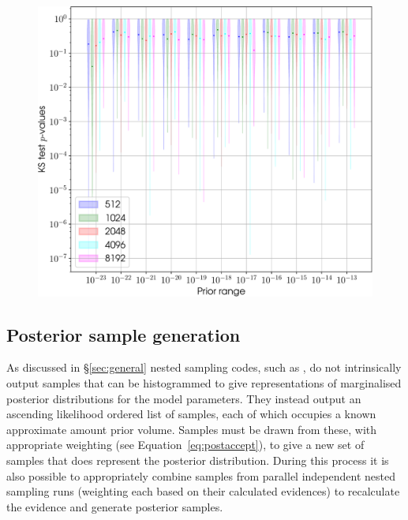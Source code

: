 \begin{figure}[!phtb]
\begin{center}
\includegraphics[width=1\columnwidth]{./figures/proptesting/walk_uniform_prop/kstest/collate_plots_wup_ks}
\caption{ \protect}
\end{center}
\end{figure}

\subsection{Posterior sample generation}\label{sec:postsamps}

As discussed in \S\ref{sec:general} nested sampling codes, such as \lppen, do not intrinsically output samples that can be histogrammed to give
representations of marginalised posterior distributions for the model parameters. They instead output an ascending likelihood ordered list of samples,
each of which occupies a known approximate amount prior volume. Samples must be drawn from these, with appropriate weighting (see Equation~\ref{eq:postaccept}),
to give a new set of samples that does represent the posterior distribution. During this process it is also possible to appropriately combine samples from parallel
independent nested sampling runs (weighting each based on their calculated evidences) to recalculate the evidence and generate posterior samples.

